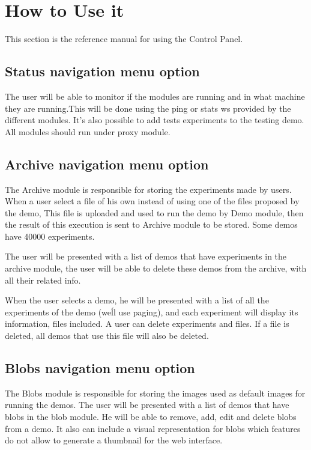 \section{How to Use it}
This section is the reference manual for using the Control Panel.

\subsection{Status navigation menu option}
The user will be able to monitor if the modules are running and in what machine they are running.This will be done using the ping or stats ws provided by the different modules.
It's also possible to add tests experiments to the testing demo.
All modules should run under proxy module.

\subsection{Archive navigation menu option}
The Archive module is responsible for storing the experiments made by users. When a user select a file of his own instead of using one of the files proposed by the demo, This file is uploaded and used to run the demo by Demo module, then the result of this execution is sent to Archive module to be stored. Some demos have 40000 experiments.

The user will be presented with a list of demos that have experiments in the archive module, the user will be able to delete these demos from the archive, with all their related info.

When the user selects a demo, he will be presented with a list of all the experiments of the demo (we\'ll use paging), and each experiment will display its information, files included. A user can delete experiments and files. If a file is deleted, all demos that use this file will also be deleted.


\subsection{Blobs navigation menu option}
The Blobs module is responsible for storing the images used as default images for running the demos.
The user will be presented with a list of demos that have blobs in the blob module. He will be able to remove, add, edit and delete blobs from a demo. It also can include a visual representation for blobs which features do not allow to generate a thumbnail for the web interface. 


